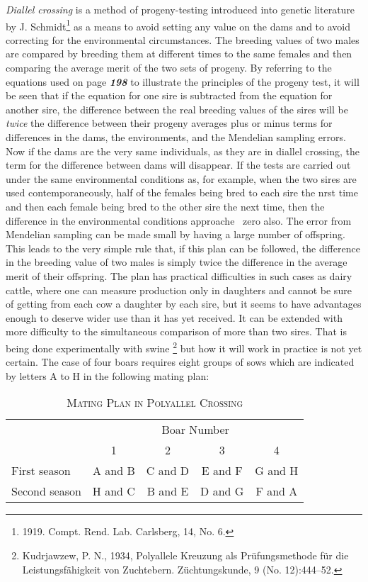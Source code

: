 \textit{Diallel crossing} is a method of progeny-testing introduced into genetic
literature by J. Schmidt\footnote{1919. Compt. Rend. Lab. Carlsberg, 14,
No. 6.} as a means to avoid setting any value on
the dams and to avoid correcting for the environmental circumstances.
The breeding values of two males are compared by breeding them at
different times to the same females and then comparing the average
merit of the two sets of progeny. By referring to the equations used on
page \textit{\textbf{198}} to illustrate the principles of the progeny test, it will be seen
that if the equation for one sire is subtracted from the equation for
another sire, the difference between the real breeding values of the sires
will be \textit{twice} the difference between their progeny averages plus or
minus terms for differences in the dams, the environments, and the
Mendelian sampling errors. Now if the dams are the very same individuals,
as they are in diallel crossing, the term for the difference
between dams will disappear. If the tests are carried out under the same
environmental conditions as, for example, when the two sires are used
contemporaneously, half of the females being bred to each sire the
nrst time and then each female being bred to the other sire the next
time, then the difference in the environmental conditions approache~
zero also. The error from Mendelian sampling can be made small by
having a large number of offspring. This leads to the very simple rule
that, if this plan can be followed, the difference in the breeding value of
two males is simply twice the difference in the average merit of their
offspring. The plan has practical difficulties in such cases as dairy cattle,
where one can measure production only in daughters and cannot be
sure of getting from each cow a daughter by each sire, but it seems to
have advantages enough to deserve wider use than it has yet received.
It can be extended with more difficulty to the simultaneous comparison
of more than two sires. That is being done experimentally with swine
\footnote{Kudrjawzew, P. N., 1934, Polyallele Kreuzung als Pr\"ufungsmethode
f\"ur die Leistungsf\"ahigkeit von Zuchtebern. Z\"uchtungskunde, 9 (No. 12):444--52.}
but how it will work in practice is not yet certain. The case of four
boars requires eight groups of sows which are indicated by letters A to
H in the following mating plan:

\begin{table}[h]
	\centering
	\caption{\textsc{Mating Plan in Polyallel Crossing}}
	\begin{tabular}{l|c|c|c|c}
		\hline
		\hline
		 				& \multicolumn{4}{c}{Boar Number} \\
		 				\cline{2-5}
		 				& 1 &	2 &	3	& 4	\\
		\hline
		First season	& A and B	& C and D	& E and F	& G and H \\
		Second season	& H and C	& B and E	& D and G	& F and A \\
		\hline
	\end{tabular}
\end{table}

